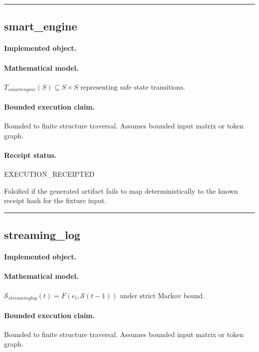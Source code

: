 \vspace{1em}\hrule\vspace{1em}
\subsection{smart\_engine}
\paragraph{Implemented object.} 
\paragraph{Mathematical model.} $T_{smartengine}(S) \subseteq S \times S \text{ representing safe state transitions}.$
\paragraph{Bounded execution claim.} Bounded to finite structure traversal. Assumes bounded input matrix or token graph.
\paragraph{Receipt status.} EXECUTION\_RECEIPTED
\begin{falsifier}
Falsified if the generated artifact fails to map deterministically to the known receipt hash for the fixture input.
\end{falsifier}

\vspace{1em}\hrule\vspace{1em}
\subsection{streaming\_log}
\paragraph{Implemented object.} 
\paragraph{Mathematical model.} $\mathcal{S}_{streaminglog}(t) = F(e_t, \mathcal{S}(t-1)) \text{ under strict Markov bound}.$
\paragraph{Bounded execution claim.} Bounded to finite structure traversal. Assumes bounded input matrix or token graph.
